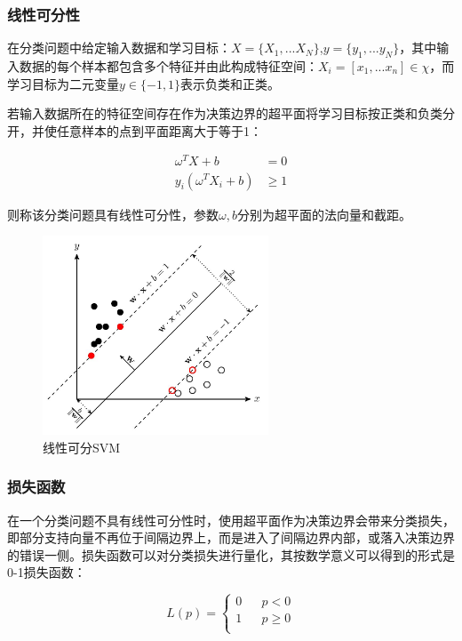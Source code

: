 \documentclass[lang=cn,11pt]{elegantpaper}
\begin{document}
\subsubsection{线性可分性}
在分类问题中给定输入数据和学习目标：$X=\{X_1,...X_N\}$,$y = \{y_1,...y_N\}$，其中输入数据的每个样本都包含多个特征并由此构成特征空间：$X_i=[x_1,...x_n]\in \chi$，而学习目标为二元变量$y\in \{-1, 1\}表示负类和正类$。\par
若输入数据所在的特征空间存在作为决策边界的超平面将学习目标按正类和负类分开，并使任意样本的点到平面距离大于等于1：\par
\begin{align*}
	\omega^TX+b&=0\\
	y_i(\omega^TX_i+b)&\geq 1
\end{align*}

则称该分类问题具有线性可分性，参数$\omega, b$分别为超平面的法向量和截距。\par
\begin{figure}[H]
	\centering
	\includegraphics[width=0.6\textwidth]{figure/knn3.jpeg}
	\caption{线性可分SVM \label{fig:svm}}
\end{figure}
\subsubsection{损失函数}
在一个分类问题不具有线性可分性时，使用超平面作为决策边界会带来分类损失，即部分支持向量不再位于间隔边界上，而是进入了间隔边界内部，或落入决策边界的错误一侧。损失函数可以对分类损失进行量化，其按数学意义可以得到的形式是0-1损失函数：\par
\begin{equation}
L(p)=\left\{
\begin{aligned}
0 &  & p<0 \\
1 &  & p\geq 0 \\
\end{aligned}
\right.
\end{equation}
\end{document}
